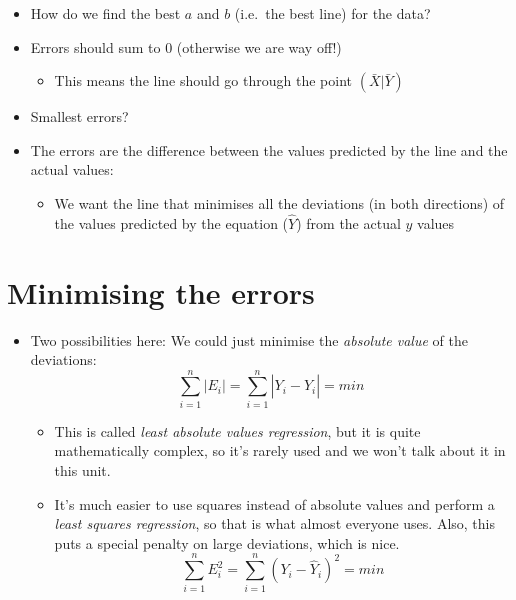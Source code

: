 \documentclass[]{article}
\providecommand{\tightlist}{%
  \setlength{\itemsep}{0pt}\setlength{\parskip}{0pt}}
\begin{document}
\begin{itemize}
\tightlist
\item
  How do we find the best \(a\) and \(b\) (i.e.~the best line) for the
  data?
\item
  Errors should sum to 0 (otherwise we are way off!)

  \begin{itemize}
  \tightlist
  \item
    This means the line should go through the point
    \((\bar{X}|\bar{Y})\)
  \end{itemize}
\item
  Smallest errors?
\item
  The errors are the difference between the values predicted by the line
  and the actual values:

  \begin{itemize}
  \tightlist
  \item
    We want the line that minimises all the deviations (in both
    directions) of the values predicted by the equation (\(\hat{Y}\))
    from the actual \(y\) values
  \end{itemize}
\end{itemize}

\section{Minimising the errors}\label{minimising-the-errors}

\begin{itemize}
\tightlist
\item
  Two possibilities here: We could just minimise the \emph{absolute
  value} of the deviations:
  \[\sum\limits_{i=1}^{n} \left|E_i\right| = \sum\limits_{i=1}^{n}\left|Y_i - \hat{Y}_i\right| =min\]

  \begin{itemize}
  \tightlist
  \item
    This is called \emph{least absolute values regression}, but it is
    quite mathematically complex, so it's rarely used and we won't talk
    about it in this unit.
  \item
    It's much easier to use squares instead of absolute values and
    perform a \emph{least squares regression}, so that is what almost
    everyone uses. Also, this puts a special penalty on large
    deviations, which is nice.
    \[\sum\limits_{i=1}^{n} E_i^2 = \sum\limits_{i=1}^{n}(Y_i - \hat{Y}_i)^2 =min\]
  \end{itemize}
\end{itemize}
\end{document}
